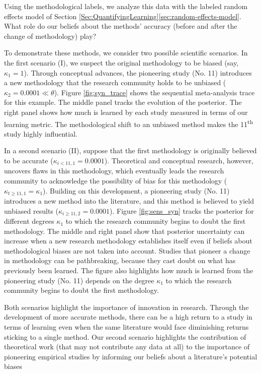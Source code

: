 Using the methodological labels, we analyze this data
with the labeled random effects model of
Section \ref{Sec:QuantifyingLearning}\ref{sec:random-effects-model}. What role do our beliefs
about the methods' accuracy (before and after the change of
methodology) play?

To demonstrate these methods, we consider two possible scientific
scenarios.  In the first scenario (I), we suspect the original
methodology to be biased (say, $\kappa_1 = 1$). Through conceptual
advances, the pioneering study (No. 11) introduces a new methodology
that the research community holds to be unbiased
($\kappa_2 = 0.0001 \ll \theta$). Figure \ref{fig:syn_trace}
shows the sequential meta-analysis trace for this example.
The middle panel tracks the evolution of the posterior. The right panel shows how much is learned by each study measured in terms of our
learning metric. The methodological shift to an unbiased method makes
the 11\textsuperscript{th} study highly influential.

In a second scenario (II), suppose that the first methodology is
originally believed to be accurate ($\kappa_{i<11,1} =
0.0001$). Theoretical and conceptual research, however, uncovers flaws
in this methodology, which eventually leads the research community to
acknowledge the possibility of bias for this methodology
($\kappa_{t\geq 11,1} = \kappa_1$). Building on this development, a
pioneering study (No. 11) introduces a new method into the literature,
and this method is believed to yield unbiased results
($\kappa_{i\geq 11,2} = 0.0001$).  Figure \ref{fig:sens_syn} tracks the posterior for different degrees $\kappa_1$ to which the research community
begins to doubt the first methodology. The middle and right panel show that posterior uncertainty can
increase when a new research methodology establishes itself even if
beliefs about methodological biases are not taken into
account. Studies that pioneer a change in methodology can be
pathbreaking, because they cast doubt on what has previously been
learned. The figure also highlights how much is learned from the pioneering study (No. 11)
depends on the degree $\kappa_1$ to which the research community
begins to doubt the first methodology.

Both scenarios highlight the importance of innovation in
research. Through the development of more accurate methods, there can
be a high return to a study in terms of learning even when the same
literature would face diminishing returns sticking to a single
method. Our second scenario highlights the contribution of theoretical
work (that may not contribute any data at all) to the importance of
pioneering empirical studies by informing our beliefs about a
literature's potential biases


